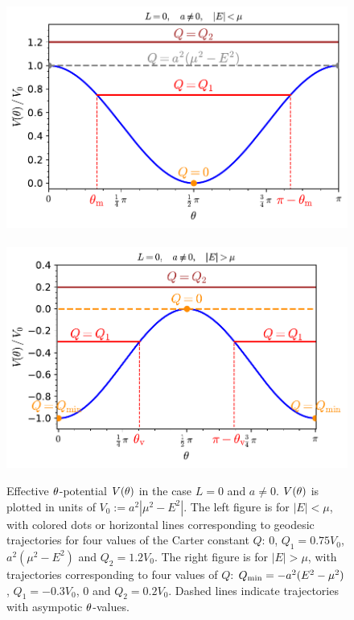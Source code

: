 \begin{figure}
\centerline{\includegraphics[height=0.24\textheight]{gek_th_pot_L_0_low_E.pdf}
\ \includegraphics[height=0.24\textheight]{gek_th_pot_L_0_high_E.pdf}}
\caption[]{\label{f:gek:th_pot_L_0} \footnotesize
Effective $\theta$-potential $V(\theta)$ in the case $L=0$ and $a\neq 0$. $V(\theta)$ is plotted
in units of $V_0 := a^2|\mu^2 - E^2|$.
The left figure is for $|E| < \mu$, with colored dots or horizontal lines
corresponding to geodesic trajectories for four values of the Carter constant $Q$:
$0$, $Q_1 = 0.75 V_0$, $a^2(\mu^2 - E^2)$ and $Q_2 = 1.2 V_0$.
The right figure is for $|E| > \mu$, with trajectories corresponding
to four values of $Q$: $Q_{\rm min} = -a^2(E^2 - \mu^2)$,
$Q_1 = -0.3 V_0$, $0$ and $Q_2 = 0.2 V_0$.
Dashed lines indicate trajectories with asympotic $\theta$-values.
}
\end{figure}


